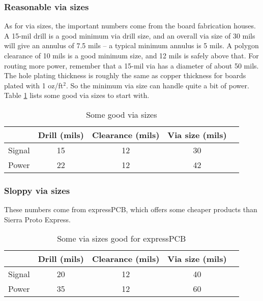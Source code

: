 \subsubsection{Reasonable via sizes}
As for via sizes, the important numbers come from the board
fabrication houses.  A 15-mil drill is a good minimum via drill size,
and an overall via size of 30 mils will give an annulus of 7.5 mils --
a typical minimum annulus is 5 mils.  A polygon clearance of 10 mils
is a good minimum size, and 12 mils is safely above that.  For routing
more power, remember that a 15-mil via has a diameter of about 50
mils.  The hole plating thickness is roughly the same as copper
thickness for boards plated with 1 oz/ft$^2$.  So the minimum via size
can handle quite a bit of power.  Table \ref{via_sizes} lists some
good via sizes to start with.
\begin{table}[ht]
  \begin{center}
    \begin{tabular}{|c|c|c|c|c|}\hline
      &Drill (mils)	&Clearance (mils)	&Via size (mils)\\ \hline \hline
      Signal	&15		&12			&30\\ \hline
      Power	&22		&12			&42\\ \hline
    \end{tabular}
  \end{center}
  \caption{Some good via sizes\label{via_sizes}}
\end{table}

\subsubsection{Sloppy via sizes}
These numbers come from expressPCB, which offers some cheaper products
than Sierra Proto Express.
\begin{table}[ht]
  \begin{center}
    \begin{tabular}{|c|c|c|c|c|}\hline
      &Drill (mils)	&Clearance (mils)	&Via size (mils)\\ \hline \hline
      Signal	&20		&12			&40\\ \hline
      Power	&35		&12			&60\\ \hline
    \end{tabular}
  \end{center}
  \caption{Some via sizes good for expressPCB\label{tab:epcb_sizes}}
\end{table}


